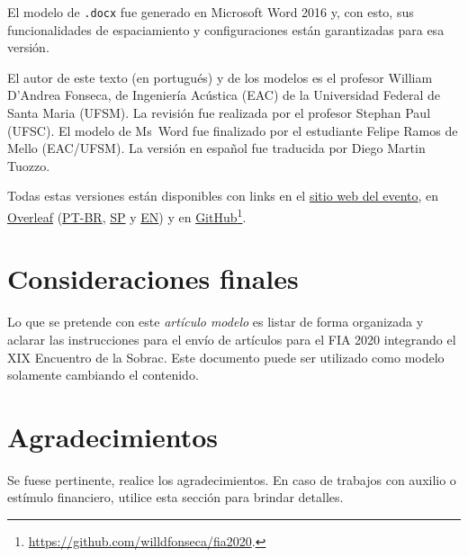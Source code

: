 \documentclass[12pt, a4paper, twoside, twocolumn]{article}
\begin{document}
El modelo de \texttt{.docx} fue generado en Microsoft Word 2016 y, con esto, sus funcionalidades de espaciamiento y configuraciones están garantizadas para esa versión.

El autor de este texto (en portugués) y de los modelos es el profesor William D'Andrea Fonseca, de Ingeniería Acústica (EAC) de la Universidad Federal de Santa Maria (UFSM).
%
La revisión fue realizada por el profesor {Stephan Paul} (UFSC).
El modelo de Ms~Word fue finalizado por el estudiante Felipe Ramos de Mello (EAC/UFSM).
%
La versión en español fue traducida por Diego Martin Tuozzo.

Todas estas versiones están disponibles con links en el \href{http://fia2020.com.br}{sitio web del evento}, en \href{https://www.overleaf.com/read/rszcxtwshzfr}{Overleaf} (\href{https://www.overleaf.com/read/rnfjxkknksnd}{PT-BR}, \href{https://www.overleaf.com/read/rszcxtwshzfr}{SP} y \href{https://www.overleaf.com/read/hgryywpgmxdx}{EN}) y en \href{https://github.com/willdfonseca/fia2020}{GitHub}\footnote{\url{https://github.com/willdfonseca/fia2020}.}.

\section{Consideraciones finales}

Lo que se pretende con este \textit{artículo modelo} es listar de forma organizada y aclarar las instrucciones para el envío de artículos para el FIA 2020 integrando el XIX Encuentro de la Sobrac. Este documento puede ser utilizado como modelo solamente cambiando el contenido.

\section{Agradecimientos}

Se fuese pertinente, realice los agradecimientos.
%
En caso de trabajos con auxilio o estímulo financiero, utilice esta sección para brindar detalles.
\end{document}
